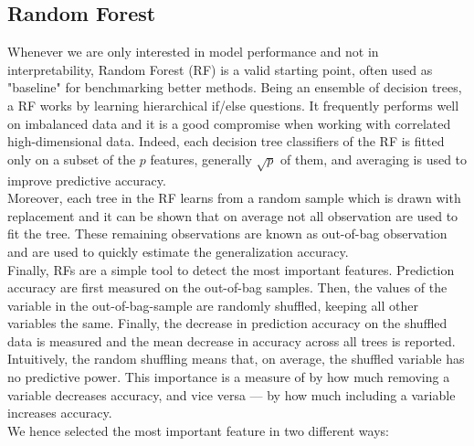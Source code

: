 \documentclass[a4paper,11pt, oneside]{article}  %
\begin{document}
\subsection{Random Forest}
Whenever we are only interested in model performance and not in interpretability, Random Forest (RF) is a valid starting point, often used as "baseline" for benchmarking better methods. Being an ensemble of decision trees, a RF works by learning hierarchical if/else questions. It frequently performs well on imbalanced data and it is a good compromise when working with correlated high-dimensional data. Indeed, each decision tree classifiers of the RF is fitted only on a subset of the $p$ features, generally $\sqrt{p}$ of them, and averaging is used to improve predictive accuracy. \\
Moreover, each tree in the RF learns from a random sample which is drawn with replacement and it can be shown that on average not all observation are used to fit the tree. These remaining observations are known as out-of-bag observation and are used to quickly estimate the generalization accuracy. \\
Finally, RFs are a simple tool to detect the most important features. Prediction accuracy are first measured on the out-of-bag samples. Then, the values of the variable in the out-of-bag-sample are randomly shuffled, keeping all other variables the same. Finally, the decrease in prediction accuracy on the shuffled data is measured and the mean decrease in accuracy across all trees is reported. Intuitively, the random shuffling means that, on average, the shuffled variable has no predictive power. This importance is a measure of by how much removing a variable decreases accuracy, and vice versa — by how much including a variable increases accuracy. \\
We hence selected the most important feature in two different ways:
\end{document}
